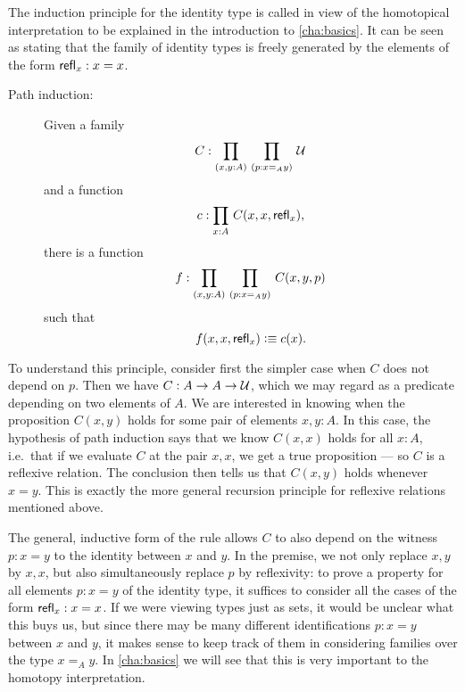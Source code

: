 
The induction principle for the identity type is called  in view of the homotopical interpretation to be explained in  the introduction to \autoref{cha:basics}.  It can be seen as stating that the family of identity types is freely generated by the elements of the form $\mathsf{refl}_{x}: x = x$.

\begin{description}
\item[Path induction:] 
  Given a family 
  \[ C : \prd{x,y:A}{p:x =_A y} \UU \]
  and a function
  \[ c :  \prd{x:A} C(x,x,\refl{x}),\]
  there is a function
  \[ f : \prd{x,y:A}{p:x =_A y} C(x,y,p) \]
  such that 
  \[ f(x,x,\mathsf{refl}_{x}) \vcentcolon\equiv c(x). \]
\end{description}

%
To understand this principle, consider first the simpler case when $C$ does not depend on $p$.
Then we have $C:A\to A\to \mathcal{U}$, which we may regard as a predicate depending on two elements of $A$.
We are interested in knowing when the proposition $C(x,y)$ holds for some pair of elements $x,y:A$.
In this case, the hypothesis of path induction says that we know $C(x,x)$ holds for all $x:A$, i.e.\ that if we evaluate $C$ at the pair $x, x$, we get a true proposition --- so $C$ is a reflexive relation.
The conclusion then tells us that $C(x,y)$ holds whenever $x=y$.  This is exactly the more general recursion principle for reflexive relations mentioned above.

The general, inductive form of the rule allows $C$ to also depend on the witness $p:x=y$ to the identity between $x$ and $y$.  In the premise, we not only replace $x, y$ by $x,x$, but also simultaneously replace $p$ by reflexivity: to prove a property for all elements $p : x = y$ of the identity type, it suffices to consider all the cases of the form $\mathsf{refl}_{x}: x = x$.  If we were viewing types just as sets, it would be unclear what this buys us, but since there may be many different identifications $p : x = y$ between $x$ and $y$, it makes sense to keep track of them in considering families over the type $x =_A y$.
In \autoref{cha:basics} we will see that this is very important to the homotopy interpretation.

